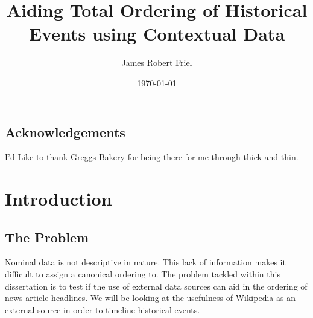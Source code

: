 \documentclass[bsc,frontabs,twoside,singlespacing,parskip,deptreport]{infthesis}     %
\begin{document}
\title{Aiding Total Ordering of Historical Events using Contextual Data}

\author{James Robert Friel}
 

\date{\today}

\abstract{}


\maketitle

\section*{Acknowledgements}
I'd Like to thank Greggs Bakery for being there for me through thick and thin.

\tableofcontents



\chapter{Introduction}
\section{The Problem}
Nominal data is not descriptive in nature. This lack of information makes it difficult to assign
a canonical ordering to.
The problem tackled within this dissertation is to test if the use of external data sources can
aid in the ordering of news article headlines.
We will be looking at the usefulness of Wikipedia as an external source in order to timeline
historical events.
\end{document}
